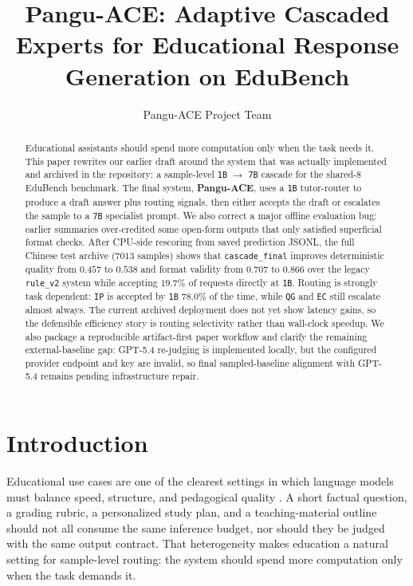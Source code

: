 \documentclass{article}
\title{Pangu-ACE: Adaptive Cascaded Experts for Educational Response Generation on EduBench}
\author{
  Pangu-ACE Project Team
}
\begin{document}
\maketitle

\begin{abstract}
Educational assistants should spend more computation only when the task needs it. This paper rewrites our earlier draft around the system that was actually implemented and archived in the repository: a sample-level \texttt{1B} $\rightarrow$ \texttt{7B} cascade for the shared-8 EduBench benchmark. The final system, \textbf{Pangu-ACE}, uses a \texttt{1B} tutor-router to produce a draft answer plus routing signals, then either accepts the draft or escalates the sample to a \texttt{7B} specialist prompt. We also correct a major offline evaluation bug: earlier summaries over-credited some open-form outputs that only satisfied superficial format checks. After CPU-side rescoring from saved prediction JSONL, the full Chinese test archive (\(7013\) samples) shows that \texttt{cascade\_final} improves deterministic quality from \(0.457\) to \(0.538\) and format validity from \(0.707\) to \(0.866\) over the legacy \texttt{rule\_v2} system while accepting \(19.7\%\) of requests directly at \texttt{1B}. Routing is strongly task dependent: \texttt{IP} is accepted by \texttt{1B} \(78.0\%\) of the time, while \texttt{QG} and \texttt{EC} still escalate almost always. The current archived deployment does not yet show latency gains, so the defensible efficiency story is routing selectivity rather than wall-clock speedup. We also package a reproducible artifact-first paper workflow and clarify the remaining external-baseline gap: GPT-5.4 re-judging is implemented locally, but the configured provider endpoint and key are invalid, so final sampled-baseline alignment with GPT-5.4 remains pending infrastructure repair.
\end{abstract}


\section{Introduction}
Educational use cases are one of the clearest settings in which language models must balance speed, structure, and pedagogical quality \cite{xu2024large, agent_survey, edubench}. A short factual question, a grading rubric, a personalized study plan, and a teaching-material outline should not all consume the same inference budget, nor should they be judged with the same output contract. That heterogeneity makes education a natural setting for sample-level routing: the system should spend more computation only when the task demands it.
\end{document}
